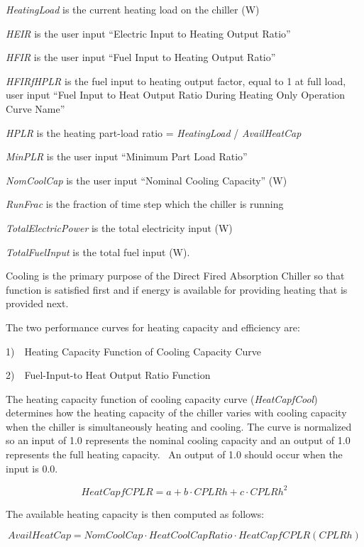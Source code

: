 \emph{HeatingLoad} is the current heating load on the chiller (W)

\emph{HEIR} is the user input ``Electric Input to Heating Output Ratio''

\emph{HFIR} is the user input ``Fuel Input to Heating Output Ratio''

\emph{HFIRfHPLR} is the fuel input to heating output factor, equal to 1 at full load, user input ``Fuel Input to Heat Output Ratio During Heating Only Operation Curve Name''

\emph{HPLR} is the heating part-load ratio = \emph{HeatingLoad} / \emph{AvailHeatCap}

\emph{MinPLR} is the user input ``Minimum Part Load Ratio''

\emph{NomCoolCap} is the user input ``Nominal Cooling Capacity'' (W)

\emph{RunFrac} is the fraction of time step which the chiller is running

\emph{TotalElectricPower} is the total electricity input (W)

\emph{TotalFuelInput} is the total fuel input (W).

Cooling is the primary purpose of the Direct Fired Absorption Chiller so that function is satisfied first and if energy is available for providing heating that is provided next.

The two performance curves for heating capacity and efficiency are:

1)~~Heating Capacity Function of Cooling Capacity Curve

2)~~Fuel-Input-to Heat Output Ratio Function

The heating capacity function of cooling capacity curve (\emph{HeatCapfCool}) determines how the heating capacity of the chiller varies with cooling capacity when the chiller is simultaneously heating and cooling. The curve is normalized so an input of 1.0 represents the nominal cooling capacity and an output of 1.0 represents the full heating capacity.~ An output of 1.0 should occur when the input is 0.0.

\begin{equation}
HeatCapfCPLR = a + b \cdot CPLRh + c \cdot CPLR{h^2}
\end{equation}

The available heating capacity is then computed as follows:

\begin{equation}
AvailHeatCap = NomCoolCap \cdot HeatCoolCapRatio \cdot HeatCapfCPLR(CPLRh)
\end{equation}

